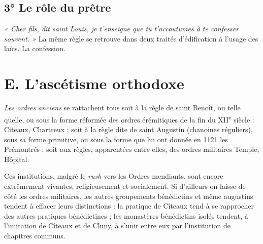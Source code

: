 \documentclass[french,twoside]{book} %
\newcommand{\labelchar}[1]{{\color{rubric}\bf #1}}
\begin{document}
\subsection[3° Le rôle du prêtre]{3° Le rôle du prêtre}
\noindent \emph{« Cher fils, dit saint Louis, je t’enseigne que tu t’accoutumes à te confesser souvent. »} La même règle se retrouve dans deux traités d’édification à l’usage des laïcs. La confession.
\section[E. L’ascétisme orthodoxe]{E. L’ascétisme orthodoxe}
\label{c10e}
\noindent \labelchar{1)} {\itshape Les ordres anciens} se rattachent tous soit à la règle de saint Benoît, ou telle quelle, ou sous la forme réformée des ordres érémitiques de la fin du XII\textsuperscript{e} siècle : Citeaux, Chartreux ; soit à la règle dite de saint Augustin (chanoines réguliers), sous sa forme primitive, ou sous la forme que lui ont donnée en 1121 les Prémontrés ;  
\label{p110} soit aux règles, apparentées entre elles, des ordres militaires Temple, Hôpital.\par
Ces institutions, malgré le {\itshape rush} vers les Ordres mendiants, sont encore extrêmement vivantes, religieusement et socialement. Si d’ailleurs on laisse de côté les ordres militaires, les autres groupements bénédictins et même augustins tendent à effacer leurs distinctions : la pratique de Cîteaux tend à se rapprocher des autres pratiques bénédictines ; les monastères bénédictins isolés tendent, à l’imitation de Cîteaux et de Cluny, à s’unir entre eux par l’institution de chapitres communs.\par
\end{document}
